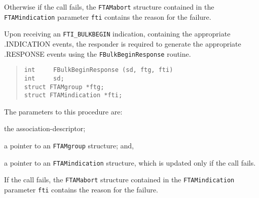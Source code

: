 Otherwise if the call fails,
the \verb"FTAMabort" structure contained in the
\verb"FTAMindication" parameter \verb"fti" contains the reason for the failure.

Upon receiving an \verb"FTI_BULKBEGIN" indication,
containing the appropriate {\sf .INDICATION\/} events,
the responder is required to generate the appropriate {\sf .RESPONSE\/}
events using the \verb"FBulkBeginResponse" routine.
\begin{quote}\small\begin{verbatim}
int     FBulkBeginResponse (sd, ftg, fti)
int     sd;
struct FTAMgroup *ftg;
struct FTAMindication *fti;
\end{verbatim}\end{quote}
The parameters to this procedure are:
\begin{describe}
\item[\verb"sd":] the association-descriptor;

\item[\verb"ftg":] a pointer to an \verb"FTAMgroup" structure;
and,

\item[\verb"fti":] a pointer to an \verb"FTAMindication" structure, which is
updated only if the call fails.
\end{describe}
If the call fails,
the \verb"FTAMabort" structure contained in the
\verb"FTAMindication" parameter \verb"fti" contains the reason for the failure.

